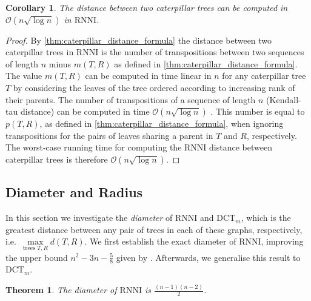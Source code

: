 \documentclass[11pt]{amsart}
\newtheorem{theorem}{Theorem}
\newtheorem{corollary}{Corollary}
\newcommand{\rnni}{\mathrm{RNNI}}
\newcommand{\dct}{\mathrm{DCT}}
\renewcommand{\O}{\mathcal O}
\newcommand{\summary}[1]{} %
\begin{document}
\begin{corollary}
	The distance between two caterpillar trees can be computed in $\O(n \sqrt{\log n})$ in $\rnni$.
	\label{cor:caterpillar_distance_rnni_nlogn}
\end{corollary}
\vspace{-0.66cm}

\begin{proof}
	By \autoref{thm:caterpillar_distance_formula} the distance between two caterpillar trees in $\rnni$ is the number of transpositions between two sequences of length $n$ minus $m(T,R)$ as defined in \autoref{thm:caterpillar_distance_formula}.
	The value $m(T,R)$ can be computed in time linear in $n$ for any caterpillar tree $T$ by considering the leaves of the tree ordered according to increasing rank of their parents.
	The number of transpositions of a sequence of length $n$ (Kendall-tau distance) can be computed in time $\O(n \sqrt{\log n})$ \autocite{Chan2010-ls}.
	This number is equal to $p(T,R)$, as defined in \autoref{thm:caterpillar_distance_formula}, when ignoring transpositions for the pairs of leaves sharing a parent in $T$ and $R$, respectively.
	The worst-case running time for computing the $\rnni$ distance between caterpillar trees is therefore $\O(n \sqrt{\log n})$.
\end{proof}

\subsection{Diameter and Radius}

\label{section:diameter}
\summary{Definition of Diameter.}
In this section we  investigate the \emph{diameter} of $\rnni$ and $\dct_m$, which is the greatest distance between any pair of trees in each of these graphs, respectively, i.e.\ $\max\limits_{\text{trees }T,R}d(T,R)$.
We first establish the exact diameter of $\rnni$, improving the upper bound $n^2 - 3n - \frac{5}{8}$ given by \textcite{Gavryushkin2018-ol}.
Afterwards, we generalise this result to $\dct_m$.

\begin{theorem}
	The diameter of $\rnni$ is $\frac{(n-1)(n-2)}{2}$.
	\label{thm:diameter_rnni}
\end{theorem}
\end{document}
